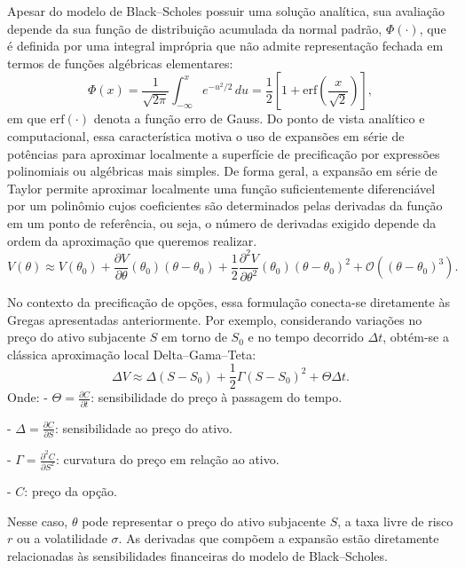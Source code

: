 Apesar do modelo de Black--Scholes possuir uma solução analítica, sua avaliação depende da sua função de distribuição acumulada da normal padrão, $\Phi(\cdot)$, que é definida por uma integral imprópria \cite{strang2016} que não admite representação fechada em termos de funções algébricas elementares:
\begin{equation}
\Phi(x) = \frac{1}{\sqrt{2\pi}} \int_{-\infty}^{x} e^{-u^2/2}\,du = \frac{1}{2}\left[1 + \text{erf}\left(\frac{x}{\sqrt{2}}\right)\right],
\end{equation}
em que $\text{erf}(\cdot)$ denota a função erro de Gauss. Do ponto de vista analítico e computacional, essa característica motiva o uso de expansões em série de potências para aproximar localmente a superfície de precificação por expressões polinomiais ou algébricas mais simples.
De forma geral, a expansão  em série de Taylor \cite{strang2016} permite aproximar localmente uma função suficientemente diferenciável por um polinômio cujos coeficientes são determinados pelas derivadas da função em um ponto de referência, ou seja, o número de derivadas exigido depende da ordem da aproximação que queremos realizar.
\begin{equation}
V(\theta) \approx V(\theta_0) + \frac{\partial V}{\partial \theta}(\theta_0)(\theta - \theta_0) + \frac{1}{2}\frac{\partial^2 V}{\partial \theta^2}(\theta_0)(\theta - \theta_0)^2 + \mathcal{O}\left((\theta - \theta_0)^3\right).
\end{equation}

No contexto da precificação de opções, essa formulação conecta-se diretamente às Gregas apresentadas anteriormente. Por exemplo, considerando variações no preço do ativo subjacente $S$ em torno de $S_0$ e no tempo decorrido $\Delta t$, obtém-se a clássica aproximação local Delta--Gama--Teta:
\begin{equation}
\Delta V \approx \Delta (S - S_0) + \frac{1}{2}\Gamma (S - S_0)^2 + \Theta \Delta t.
\end{equation}
Onde:
- \(\Theta=\frac{\partial C}{\partial t}\): sensibilidade do preço à passagem do tempo.

- \(\Delta=\frac{\partial C}{\partial S}\): sensibilidade ao preço do ativo.

- \(\Gamma=\frac{\partial^2 C}{\partial S^2}\): curvatura do preço em relação ao ativo.

- \(C\): preço da opção.



Nesse caso, $\theta$ pode representar o preço do
ativo subjacente $S$, a taxa livre de risco $r$
ou a volatilidade $\sigma$. As derivadas que
compõem a expansão estão diretamente relacionadas
às sensibilidades financeiras do modelo de
Black--Scholes.

